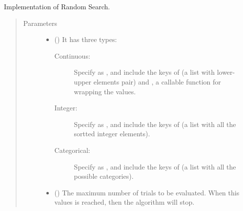 \documentclass[letterpaper,10pt,english]{sphinxmanual}
\begin{document}
\begin{fulllineitems}
\label{\detokenize{apidoc:pybatdoe.batch_rand.RandSearch}}
Implementation of Random Search.
\begin{quote}\begin{description}
\item[{Parameters}] \leavevmode\begin{itemize}
\item {} 
 () \textendash{} 
It has three types:
\begin{description}
\item[{Continuous: }] \leavevmode
Specify  as , and include the keys of  (a list with lower-upper elements pair) and
, a callable function for wrapping the values.

\item[{Integer:}] \leavevmode
Specify  as , and include the keys of  (a list with all the sortted integer elements).

\item[{Categorical:}] \leavevmode
Specify  as , and include the keys of  (a list with all the possible categories).

\end{description}


\item {} 
 (\sphinxstyleliteralemphasis{\sphinxupquote{, }}\sphinxstyleliteralemphasis{\sphinxupquote{, }}) \textendash{} The maximum number of trials to be evaluated. When this values is reached, 
then the algorithm will stop.


\end{itemize}
\end{description}
\end{quote}
\end{fulllineitems}
\end{document}
